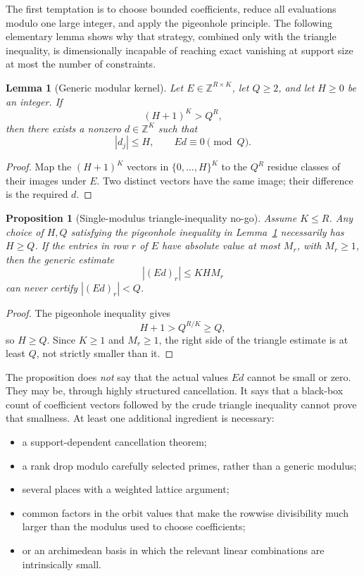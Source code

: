 \documentclass[11pt,oneside]{article}
\newtheorem{proposition}[theorem]{Proposition}
\newtheorem{lemma}[theorem]{Lemma}
\theoremstyle{definition}
\theoremstyle{remark}
\newcommand{\Z}{\mathbb Z}
\begin{document}
The first temptation is to choose bounded coefficients, reduce all evaluations modulo one
large integer, and apply the pigeonhole principle.  The following elementary lemma shows why
that strategy, combined only with the triangle inequality, is dimensionally incapable of
reaching exact vanishing at support size at most the number of constraints.

\begin{lemma}[Generic modular kernel]
\label{lem:generic-modular-kernel}
Let $E\in\Z^{R\times K}$, let $Q\ge2$, and let $H\ge0$ be an integer.  If
\[
  (H+1)^K>Q^R,
\]
then there exists a nonzero $d\in\Z^K$ such that
\[
  |d_j|\le H,
  \qquad
  Ed\equiv0\pmod Q.
\]
\end{lemma}

\begin{proof}
Map the $(H+1)^K$ vectors in $\{0,\dots,H\}^K$ to the $Q^R$ residue classes of their images
under $E$.  Two distinct vectors have the same image; their difference is the required $d$.
\end{proof}

\begin{proposition}[Single-modulus triangle-inequality no-go]
\label{prop:single-modulus-no-go}
Assume $K\le R$.  Any choice of $H,Q$ satisfying the pigeonhole inequality in
Lemma~\ref{lem:generic-modular-kernel} necessarily has $H\ge Q$.  If the entries in row $r$
of $E$ have absolute value at most $M_r$, with $M_r\ge1$, then the generic estimate
\[
  |(Ed)_r|\le KHM_r
\]
can never certify $|(Ed)_r|<Q$.
\end{proposition}

\begin{proof}
The pigeonhole inequality gives
\[
  H+1>Q^{R/K}\ge Q,
\]
so $H\ge Q$.  Since $K\ge1$ and $M_r\ge1$, the right side of the triangle estimate is at
least $Q$, not strictly smaller than it.
\end{proof}

The proposition does \emph{not} say that the actual values $Ed$ cannot be small or zero.
They may be, through highly structured cancellation.  It says that a black-box count of
coefficient vectors followed by the crude triangle inequality cannot prove that smallness.
At least one additional ingredient is necessary:
\begin{itemize}
\item a support-dependent cancellation theorem;
\item a rank drop modulo carefully selected primes, rather than a generic modulus;
\item several places with a weighted lattice argument;
\item common factors in the orbit values that make the rowwise divisibility much larger than
the modulus used to choose coefficients;
\item or an archimedean basis in which the relevant linear combinations are intrinsically
small.
\end{itemize}
\end{document}

